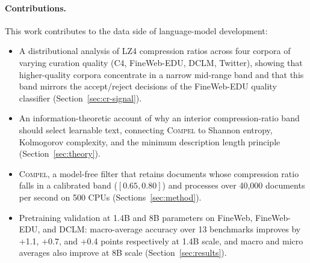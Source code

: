 \paragraph{Contributions.}
This work contributes to the data side of language-model development:
\begin{itemize}[leftmargin=1.35em,topsep=2pt,itemsep=1pt]
\item A distributional analysis of LZ4 compression ratios across four corpora of varying curation quality (C4, FineWeb-EDU, DCLM, Twitter), showing that higher-quality corpora concentrate in a narrow mid-range band and that this band mirrors the accept/reject decisions of the FineWeb-EDU quality classifier (Section~\ref{sec:cr-signal}).
\item An information-theoretic account of why an interior compression-ratio band should select learnable text, connecting \textsc{Compel} to Shannon entropy, Kolmogorov complexity, and the minimum description length principle (Section~\ref{sec:theory}).
\item \textsc{Compel}, a model-free filter that retains documents whose compression ratio falls in a calibrated band ($[0.65, 0.80]$) and processes over 40{,}000 documents per second on 500 CPUs (Sections~\ref{sec:method}).
\item Pretraining validation at 1.4B and 8B parameters on FineWeb, FineWeb-EDU, and DCLM: macro-average accuracy over 13 benchmarks improves by +1.1, +0.7, and +0.4 points respectively at 1.4B scale, and macro and micro averages also improve at 8B scale (Section~\ref{sec:results}).
\end{itemize}
